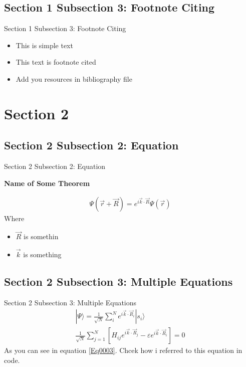 \documentclass[aspectratio=169, 9pt]{beamer}
\begin{document}
\subsection{Section 1 Subsection 3: Footnote Citing}

\begin{frame}{Section 1 Subsection 3: Footnote Citing}
\begin{itemize}
    \item This is simple text
    \item This text is footnote cited \footnotemark
    \item Add you resources in bibliography file 
\end{itemize}
\end{frame}


\section{Section 2}

\subsection{Section 2 Subsection 2: Equation}

\begin{frame}{Section 2 Subsection 2: Equation}
    \begin{flushleft}
    \textbf{Name of Some Theorem}
    \end{flushleft} 
    \begin{align}
         \Psi (\Vec{r}+ \Vec{R}) = e^{i\Vec{k}\cdot\Vec{R}}\Psi(\Vec{r})
    \end{align}
    Where
    \begin{itemize}
        \item $\Vec{R}$ is somethin
        \item $\Vec{k}$ is something
    \end{itemize}
\end{frame}


\subsection{Section 2 Subsection 3: Multiple Equations}

\begin{frame}{Section 2 Subsection 3: Multiple Equations}
    \begin{align}
        |\Psi \rangle = \frac{1}{\sqrt{N}} \sum_{i}^{N} e^{i\Vec{k}\cdot\Vec{R}_{i}}|s_{i}\rangle \label{Wavefunc} \\ 
        \frac{1}{\sqrt{N}} \sum_{j=1}^{N} \left[ H_{ij}e^{i\Vec{k}\cdot\Vec{R}_{j}}-\varepsilon e^{i\Vec{k}\cdot\Vec{R}_{i}}\right] = 0 \label{Eq0003}
    \end{align}
    As you can see in equation \ref{Eq0003}. Chcek how i referred to this equation in code. 
\end{frame}
\end{document}
